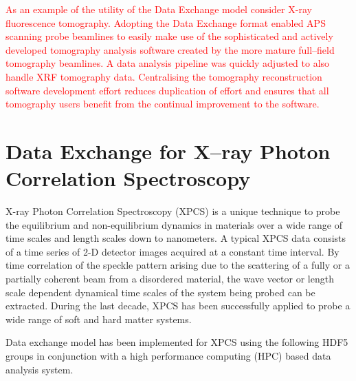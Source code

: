 \documentclass[pdf]{iucr}              %
\begin{document}
\textcolor{red}{As an example of the utility of the Data Exchange model consider X-ray fluorescence tomography. Adopting the Data Exchange format enabled APS scanning probe beamlines to easily make use of the sophisticated and actively developed tomography analysis software created by the more mature full--field tomography beamlines. A data analysis pipeline was quickly adjusted to also handle XRF tomography data. Centralising the tomography reconstruction \textcolor{red}{software} development effort reduces duplication of effort and ensures that all tomography users benefit from the continual improvement to the software.}

\section{Data Exchange for X--ray Photon Correlation Spectroscopy}

X-ray Photon Correlation Spectroscopy (XPCS) is a unique technique to probe the equilibrium and non-equilibrium dynamics in materials over a wide range of time scales and length scales down to nanometers. A typical XPCS data consists of a time series of 2-D detector images acquired at a constant time interval. By time correlation of the speckle pattern arising due to the scattering of a fully or a partially coherent beam from a disordered material, the wave vector or length scale dependent dynamical time scales of the system being probed can be extracted. During the last decade, XPCS has been successfully applied to probe a wide range of soft and hard matter systems.

Data exchange model has been implemented for XPCS using the following HDF5 groups in conjunction with a high performance computing (HPC) based data analysis system.
\end{document}
